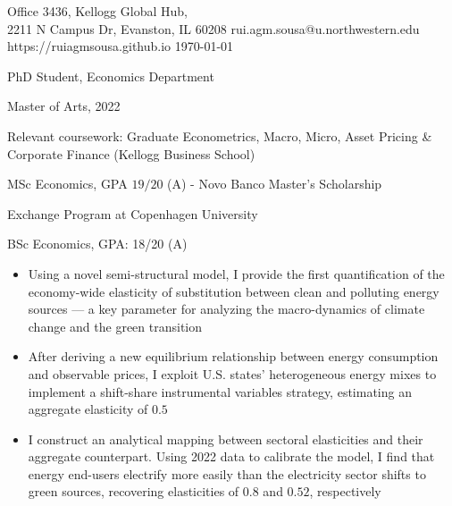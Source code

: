 \documentclass{practical-resume}
\begin{document}
\namehead

\begin{address}{
	Office 3436, Kellogg Global Hub, \\
	2211 N Campus Dr, Evanston, IL 60208
}
{rui.agm.sousa@u.northwestern.edu}
{https://ruiagmsousa.github.io}
{\today}
\end{address}

\begin{position}{PhD Student, }{Economics Department}
	\item Master of Arts, 2022 
	\item Relevant coursework: Graduate Econometrics, Macro, Micro, Asset Pricing \& Corporate Finance (Kellogg Business School) 
\end{position} 

	\begin{position}{MSc Economics, }{GPA $19/20$ (A) - Novo Banco Master's Scholarship}
		\item Exchange Program at Copenhagen University
	\end{position}

	\begin{position}[noitemize]{BSc Economics, }{GPA: 18/20 (A)}
	\end{position}

	
\begin{itemize}[leftmargin=2.5em, itemsep=-0.25em, topsep=0.5em]\vspace{-0.3em}
    \item Using a novel semi-structural model, I provide the first quantification of the economy-wide elasticity of substitution between clean and polluting energy sources — a key parameter for analyzing the macro-dynamics of climate change and the green transition
    \item After deriving a new equilibrium relationship between energy consumption and observable prices, I exploit U.S. states' heterogeneous energy mixes to implement a shift-share instrumental variables strategy, estimating an aggregate elasticity of $0.5$
    \item I construct an analytical mapping between sectoral elasticities and their aggregate counterpart. Using 2022 data to calibrate the model, I find that energy end-users electrify more easily than the electricity sector shifts to green sources, recovering elasticities of $0.8$ and $0.52$, respectively
\end{itemize}
\end{document}
